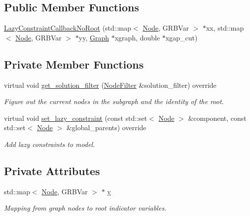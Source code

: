 \subsection*{Public Member Functions}
\begin{DoxyCompactItemize}
\item 
\hyperlink{classderegnet_1_1LazyConstraintCallbackNoRoot_abd4603bff30a09c920cdf67d8e5ba12f}{Lazy\+Constraint\+Callback\+No\+Root} (std\+::map$<$ \hyperlink{namespacederegnet_a744bad34f2de9856d36715a445f027f3}{Node}, G\+R\+B\+Var $>$ $\ast$xx, std\+::map$<$ \hyperlink{namespacederegnet_a744bad34f2de9856d36715a445f027f3}{Node}, G\+R\+B\+Var $>$ $\ast$yy, \hyperlink{namespacederegnet_a55b76c55bbabc682cbc61f8b9948799e}{Graph} $\ast$xgraph, double $\ast$xgap\+\_\+cut)
\end{DoxyCompactItemize}
\subsection*{Private Member Functions}
\begin{DoxyCompactItemize}
\item 
virtual void \hyperlink{classderegnet_1_1LazyConstraintCallbackNoRoot_a80686ee58b84bb1c73af6f7eddb50db6}{get\+\_\+solution\+\_\+filter} (\hyperlink{namespacederegnet_a50db1f8fc7c6a954d825d9e1ed9ad302}{Node\+Filter} \&solution\+\_\+filter) override
\begin{DoxyCompactList}\small\item\em Figure out the current nodes in the subgraph and the identity of the root. \end{DoxyCompactList}\item 
virtual void \hyperlink{classderegnet_1_1LazyConstraintCallbackNoRoot_a3703cd9ca73c46d70bb90f50bb2e66e5}{set\+\_\+lazy\+\_\+constraint} (const std\+::set$<$ \hyperlink{namespacederegnet_a744bad34f2de9856d36715a445f027f3}{Node} $>$ \&component, const std\+::set$<$ \hyperlink{namespacederegnet_a744bad34f2de9856d36715a445f027f3}{Node} $>$ \&global\+\_\+parents) override
\begin{DoxyCompactList}\small\item\em Add lazy constraints to model. \end{DoxyCompactList}\end{DoxyCompactItemize}
\subsection*{Private Attributes}
\begin{DoxyCompactItemize}
\item 
std\+::map$<$ \hyperlink{namespacederegnet_a744bad34f2de9856d36715a445f027f3}{Node}, G\+R\+B\+Var $>$ $\ast$ \hyperlink{classderegnet_1_1LazyConstraintCallbackNoRoot_aaa32cd3d5b65d1c41174cbc9a120ab64}{y}
\begin{DoxyCompactList}\small\item\em Mapping from graph nodes to root indicator variables. \end{DoxyCompactList}\end{DoxyCompactItemize}
